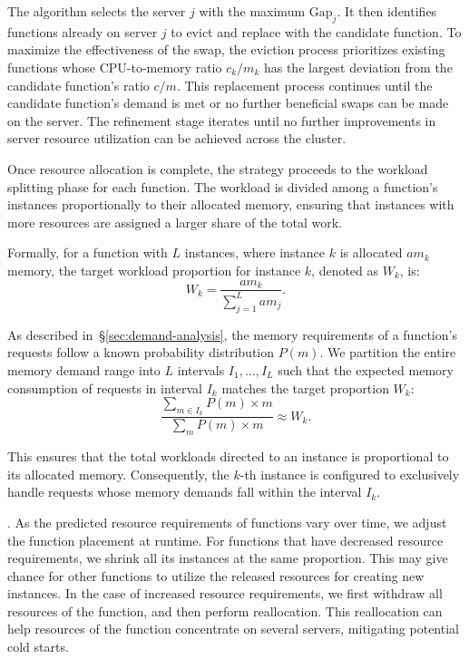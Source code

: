 The algorithm selects the server $j$ with the maximum $\text{Gap}_j$.
It then identifies functions already on server $j$ to evict and replace with the candidate function.
To maximize the effectiveness of the swap, the eviction process prioritizes existing functions whose CPU-to-memory ratio $c_k/m_k$ has the largest deviation from the candidate function's ratio $c/m$.
This replacement process continues until the candidate function's demand is met or no further beneficial swaps can be made on the server.
The refinement stage iterates until no further improvements in server resource utilization can be achieved across the cluster.

Once resource allocation is complete, the strategy proceeds to the workload splitting phase for each function.
The workload is divided among a function's instances proportionally to their allocated memory, ensuring that instances with more resources are assigned a larger share of the total work.


Formally, for a function with $L$ instances, where instance $k$ is allocated $am_k$ memory, the target workload proportion for instance $k$, denoted as $W_k$, is:
\begin{equation}
    W_k=\frac{am_k}{\sum_{j=1}^L am_j}.
\end{equation}


As described in~\S\ref{sec:demand-analysis}, the memory requirements of a function's requests follow a known probability distribution $P(m)$.
We partition the entire memory demand range into $L$ intervals $I_1, \dots, I_L$ such that the expected memory consumption of requests in interval $I_k$ matches the target proportion $W_k$:
\begin{equation}
    \frac{\sum_{m\in I_k} P(m)\times m}{\sum_{m} P(m)\times m}\approx W_k.
\end{equation}

This ensures that the total workloads directed to an instance is proportional to its allocated memory.
Consequently, the $k$-th instance is configured to exclusively handle requests whose memory demands fall within the interval $I_k$.

.
As the predicted resource requirements of functions vary over time,
we adjust the function placement at runtime.
For functions that have decreased resource requirements, we shrink all its instances at the same proportion.
This may give chance for other functions to utilize the released resources for creating new instances.
In the case of increased resource requirements, we first withdraw all resources of the function, and then perform reallocation.
This reallocation can help resources of the function concentrate on several servers, mitigating potential cold starts.



